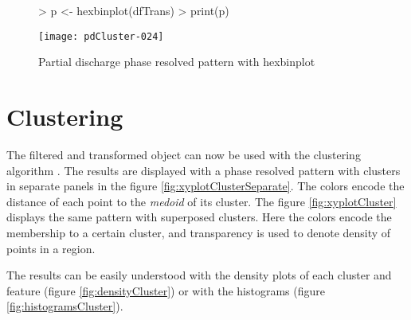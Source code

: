 \documentclass{article}
\renewenvironment{Schunk}{\begin{center}
    \scriptsize
    \begin{boxedminipage}{0.95\textwidth}}{
    \end{boxedminipage}\end{center}}
\begin{document}
\begin{figure}
  \centering
\begin{Schunk}
\begin{Sinput}
> p <- hexbinplot(dfTrans)
> print(p)
\end{Sinput}
\end{Schunk}
\texttt{[image: pdCluster-024]}
  \caption{Partial discharge phase resolved pattern with hexbinplot }
  \label{fig:hexbinplot}
\end{figure}



\section{Clustering}
\label{sec:clustering}

The filtered and transformed object can now be used with the
clustering algorithm \cite{Struyf.Hubert.ea1997}. The results are
displayed with a phase resolved pattern with clusters in separate
panels in the figure \ref{fig:xyplotClusterSeparate}. The colors
encode the distance of each point to the \emph{medoid} of its
cluster. The figure \ref{fig:xyplotCluster} displays the same pattern
with superposed clusters. Here the colors encode the membership to a
certain cluster, and transparency is used to denote density of points
in a region.

The results can be easily understood with the density plots of each
cluster and feature (figure \ref{fig:densityCluster}) or with the
histograms (figure \ref{fig:histogramsCluster}).
\end{document}
